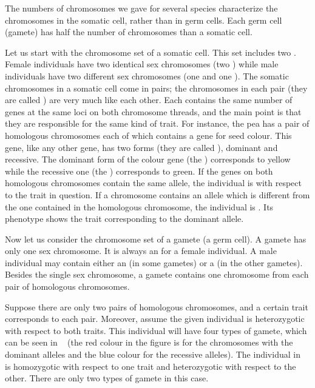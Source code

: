 The numbers of chromosomes we gave for several species characterize
the chromosomes in the somatic cell, rather than in germ cells. Each
germ cell (gamete) has half the number of chromosomes than a somatic
cell.

Let us start with the chromosome set of a somatic cell. This set
includes two . Female individuals have two identical sex
chromosomes (two ) while male individuals have two
different sex chromosomes (one  and one ). The somatic chromosomes in a somatic cell come in pairs; the chromosomes in each pair (they are called ) are very much like each other. Each contains the same number of genes at the same loci on both chromosome threads, and the main point is that they are
responsible for the same kind of trait. For instance, the pea has a pair of
homologous chromosomes each of which contains a gene for seed
colour. This gene, like any other gene, has two forms (they are called
), dominant and recessive. The dominant form of the colour gene (the ) corresponds to yellow while the recessive one (the ) corresponds to green. If the genes on both homologous chromosomes contain the same allele, the individual is  with respect to the trait in question. If a chromosome contains an allele which is different from the one contained in the homologous chromosome, the individual is . Its phenotype shows the trait corresponding to the dominant allele.

Now let us consider the chromosome set of a gamete (a germ cell).
A gamete has only one sex chromosome. It is always an  for a female individual. A male individual may contain either an  (in some gametes) or a  (in the other gametes). Besides the single sex chromosome, a gamete contains one chromosome from each pair of homologous chromosomes.


Suppose there are only two pairs of homologous chromosomes, and
a certain trait corresponds to each pair. Moreover, assume the given
individual is heterozygotic with respect to both traits. This individual
will have four types of gamete, which can be seen in ~ (the red colour in the figure is for the chromosomes with the dominant alleles and the blue colour for the recessive alleles). The individual in ~ is homozygotic with respect to one trait and heterozygotic with respect to the other. There are only two types of gamete in this case.

